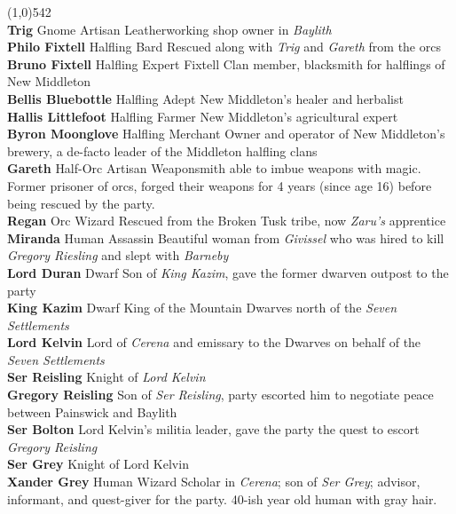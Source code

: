 \documentclass[letterpaper]{article}
\newcommand{\fullline}{\noindent\line(1,0){542} \\}
\newcommand{\person}[3]{\noindent\textbf{#1
    \ifstrequal{#2}{M}{{\color{ProcessBlue}\male}}{%
    \ifstrequal{#2}{F}{\color{VioletRed}\female}{}}}{\scriptsize #3}}
\begin{document}
 \par
\vspace{-0.75em}
\fullline
\person{Trig}{F}{Gnome Artisan} Leatherworking shop owner in \emph{Baylith} \\
\person{Philo Fixtell}{M}{Halfling Bard} Rescued along with \emph{Trig} and \emph{Gareth} from the orcs \\
\person{Bruno Fixtell}{M}{Halfling Expert} Fixtell Clan member, blacksmith for halflings of New Middleton \\
\person{Bellis Bluebottle}{F}{Halfling Adept} New Middleton's healer and herbalist \\
\person{Hallis Littlefoot}{F}{Halfling Farmer} New Middleton's agricultural expert \\
\person{Byron Moonglove}{M}{Halfling Merchant} Owner and operator of New Middleton's brewery, a de-facto leader of the Middleton halfling clans \\
\person{Gareth}{M}{Half-Orc Artisan} Weaponsmith able to imbue weapons with magic. Former prisoner of orcs, forged their weapons for 4 years (since age 16) before being rescued by the party. \\
\person{Regan}{M}{Orc Wizard} Rescued from the Broken Tusk tribe, now \emph{Zaru's} apprentice \\
\person{Miranda}{F}{Human Assassin} Beautiful woman from \emph{Givissel} who was hired to kill \emph{Gregory Riesling} and slept with \emph{Barneby} \\
\person{Lord Duran}{M}{Dwarf} Son of \emph{King Kazim}, gave the former dwarven outpost to the party \\
\person{King Kazim}{M}{Dwarf} King of the Mountain Dwarves north of the \emph{Seven Settlements} \\
\person{Lord Kelvin}{M}{} Lord of \emph{Cerena} and emissary to the Dwarves on behalf of the \emph{Seven Settlements} \\
\person{Ser Reisling}{M}{} Knight of \emph{Lord Kelvin} \\
\person{Gregory Reisling}{M}{} Son of \emph{Ser Reisling}, party escorted him to negotiate peace between Painswick and Baylith \\
\person{Ser Bolton}{M}{} Lord Kelvin's militia leader, gave the party the quest to escort \emph{Gregory Reisling} \\
\person{Ser Grey}{M}{} Knight of Lord Kelvin \\
\person{Xander Grey}{M}{Human Wizard} Scholar in \emph{Cerena}; son of \emph{Ser Grey}; advisor, informant, and quest-giver for the party.  40-ish year old human with gray hair.\\
\end{document}
